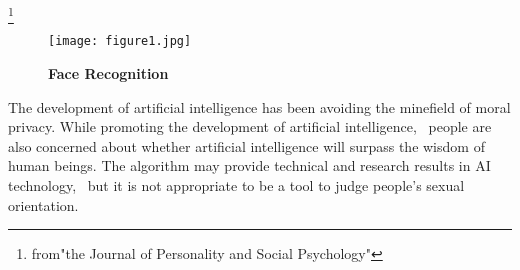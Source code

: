 \documentclass{article}
\begin{document}
\footnote{from"the Journal of Personality and Social Psychology"} 
\begin{figure}[htp]
	\centering
	\texttt{[image: figure1.jpg]}
	\caption{\bfseries{Face Recognition}}\label{pic1}
\end{figure}
	\par The development of artificial intelligence has been avoiding the minefield of moral privacy. While promoting the development of artificial intelligence,~ people are also concerned about whether artificial intelligence will surpass the wisdom of human beings. The algorithm may provide technical and research results in AI technology,~ but it is not appropriate to be a tool to judge people's sexual orientation.
\end{document}
